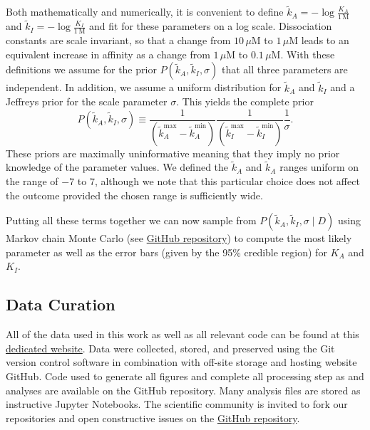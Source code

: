 Both mathematically and numerically, it is convenient to define $\tilde{k}_A =
-\log \frac{K_A}{1\,\text{M}}$ and $\tilde{k}_I = -\log \frac{K_I}{1\,\text{M}}$
and fit for these parameters on a log scale. Dissociation constants are scale
invariant, so that a change from $10\,\mu\text{M}$ to $1\,\mu\text{M}$ leads to
an equivalent increase in affinity as a change from $1\,\mu\text{M}$ to
$0.1\,\mu\text{M}$. With these definitions we assume for the prior
$P(\tilde{k}_A, \tilde{k}_I, \sigma)$ that all three parameters are independent.
In addition, we assume a uniform distribution for $\tilde{k}_A$ and
$\tilde{k}_I$ and a Jeffreys prior \citep{Sivia2006} for the scale parameter
$\sigma$. This yields the complete prior
\begin{equation}
P(\tilde{k}_A, \tilde{k}_I, \sigma) \equiv \frac{1}{(\tilde{k}_A^{\max} -
\tilde{k}_A^{\min})} \frac{1}{(\tilde{k}_I^{\max} -
\tilde{k}_I^{\min})}\frac{1}{\sigma}.
\end{equation}
These priors are maximally uninformative meaning that they imply no prior
knowledge of the parameter values. We defined the $\tilde{k}_A$ and
$\tilde{k}_A$ ranges uniform on the range of $-7$ to $7$, although we note that
this particular choice does not affect the outcome provided the chosen range is
sufficiently wide.

Putting all these terms together we can now sample from $P(\tilde{k}_A,
\tilde{k}_I, \sigma \mid D)$ using Markov chain Monte Carlo (see
\href{https://rpgroup-pboc.github.io/mwc_induction/code/notebooks/bayesian_parameter_estimation}{GitHub repository}) to compute the most likely parameter as well as the error bars (given by the 95\% credible region) for $K_A$ and $K_I$.

\subsection*{Data Curation}

All of the data used in this work as well as all relevant code can be found at
this \href{http://rpgroup-pboc.github.io/mwc_induction}{dedicated website}. Data
were collected, stored, and preserved using the Git version control software in
combination with off-site storage and hosting website GitHub. Code used to
generate all figures and complete all processing step as and analyses are
available on the GitHub repository. Many analysis files are stored as
instructive Jupyter Notebooks. The scientific community is invited to fork our
repositories and open constructive issues on the
\href{https://www.github.com/rpgroup-pboc/mwc_induction}{GitHub repository}.
